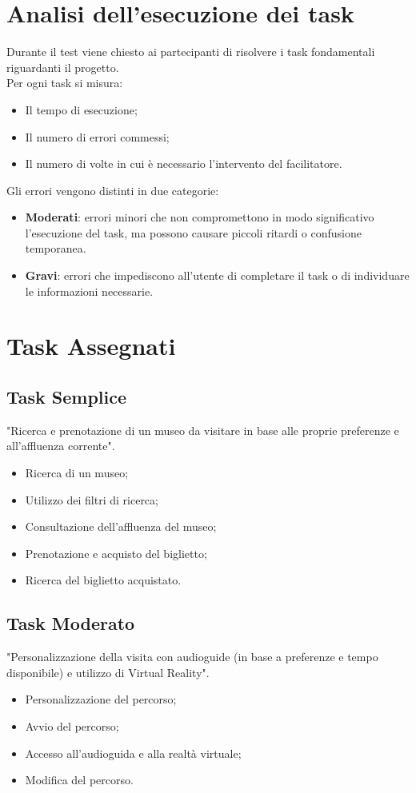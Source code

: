 \documentclass{article}
\begin{document}
\section{Analisi dell’esecuzione dei task}
Durante il test viene chiesto ai partecipanti di risolvere i task fondamentali riguardanti il progetto.\\
Per ogni task si misura:
\begin{itemize}
    \item Il tempo di esecuzione;
    \item Il numero di errori commessi;
    \item Il numero di volte in cui \`e necessario l’intervento del facilitatore.
\end{itemize}
Gli errori vengono distinti in due categorie:
\begin{itemize}
    \item \textbf{Moderati}: errori minori che non compromettono in modo significativo l'esecuzione del task, ma possono causare piccoli ritardi o confusione temporanea. 
    \item \textbf{Gravi}: errori che impediscono all'utente di completare il task o di individuare le informazioni necessarie.
\end{itemize}

\newpage

\section{Task Assegnati}
\subsection*{Task Semplice}
"Ricerca e prenotazione di un museo da visitare in base alle proprie preferenze e all’affluenza corrente".
\begin{itemize}
    \item Ricerca di un museo;
    \item Utilizzo dei filtri di ricerca;
    \item Consultazione dell’affluenza del museo;
    \item Prenotazione e acquisto del biglietto;
    \item Ricerca del biglietto acquistato.
\end{itemize}

\subsection*{Task Moderato}
"Personalizzazione della visita con audioguide (in base a preferenze e tempo disponibile) e utilizzo di Virtual Reality".
\begin{itemize}
    \item Personalizzazione del percorso;
    \item Avvio del percorso;
    \item Accesso all'audioguida e alla realt\`a virtuale;
    \item Modifica del percorso.
\end{itemize}
\end{document}
